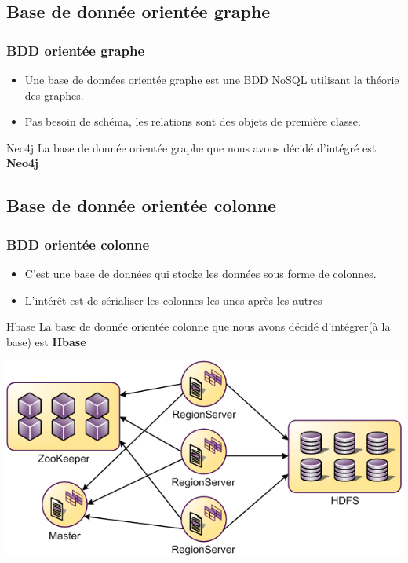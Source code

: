 \documentclass[12pt]{beamer}
\begin{document}
\subsection{Base de donnée orientée graphe}

\begin{frame}
\frametitle{BDD orientée graphe}
\begin{itemize}
\item Une base de données orientée graphe est une BDD NoSQL utilisant la théorie des graphes.
\item Pas besoin de schéma, les relations sont des objets de première classe.
\end{itemize}

\begin{block}{Neo4j}
La base de donnée orientée graphe que nous avons décidé d'intégré est \textbf{Neo4j}
\end{block}



\end{frame}
\subsection{Base de donnée orientée colonne}
\begin{frame}
\frametitle{BDD orientée colonne}
\begin{itemize}
\item C'est une base de données qui stocke les données sous forme de colonnes.
\item L'intérêt est de sérialiser les colonnes les unes après les autres
\end{itemize}

\begin{block}{Hbase}
La base de donnée orientée colonne que nous avons décidé d'intégrer(à la base) est \textbf{Hbase}
\end{block}
\begin{center}
\includegraphics[scale=0.3]{hbase-shema.png} 

\label{fig_hbase}
\end{center}

\end{frame}
\end{document}
